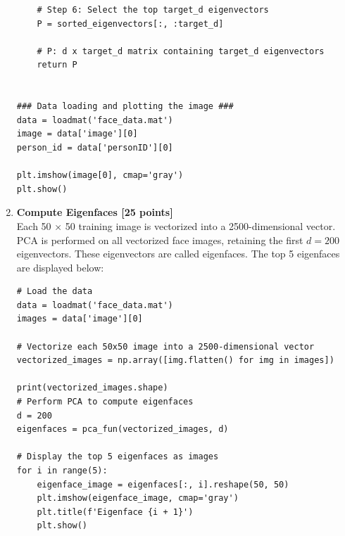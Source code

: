 \documentclass{article}
\begin{document}
\begin{enumerate}[label=(\alph*)]
\begin{verbatim}
    # Step 6: Select the top target_d eigenvectors
    P = sorted_eigenvectors[:, :target_d]

    # P: d x target_d matrix containing target_d eigenvectors
    return P


### Data loading and plotting the image ###
data = loadmat('face_data.mat')
image = data['image'][0]
person_id = data['personID'][0]

plt.imshow(image[0], cmap='gray')
plt.show()
    \end{verbatim}

    \item \textbf{Compute Eigenfaces [25 points]} \\
    Each 50 × 50 training image is vectorized into a 2500-dimensional vector. PCA is performed on all vectorized face images, retaining the first $d = 200$ eigenvectors. These eigenvectors are called eigenfaces. The top 5 eigenfaces are displayed below:

    \begin{verbatim}
# Load the data
data = loadmat('face_data.mat')
images = data['image'][0]

# Vectorize each 50x50 image into a 2500-dimensional vector
vectorized_images = np.array([img.flatten() for img in images])

print(vectorized_images.shape)
# Perform PCA to compute eigenfaces
d = 200
eigenfaces = pca_fun(vectorized_images, d)

# Display the top 5 eigenfaces as images
for i in range(5):
    eigenface_image = eigenfaces[:, i].reshape(50, 50)
    plt.imshow(eigenface_image, cmap='gray')
    plt.title(f'Eigenface {i + 1}')
    plt.show()
    \end{verbatim}


\end{enumerate}
\end{document}
